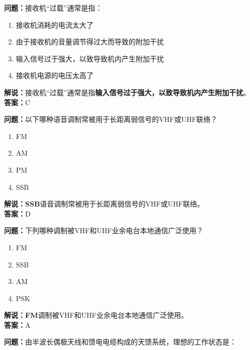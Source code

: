\documentclass{ctexbook}
\begin{document}
\bigskip


\noindent\textbf{问题：}接收机“过载”通常是指：

\begin{enumerate}[label=\Alph*), leftmargin=3em]
	\item 接收机消耗的电流太大了
	\item 由于接收机的音量调节得过大而导致的附加干扰
	\item 输入信号过于强大，以致导致机内产生附加干扰
	\item 接收机电源的电压太高了
\end{enumerate}

\noindent\textbf{解说：}接收机“过载”通常是指\textbf{输入信号过于强大，以致导致机内产生附加干扰}。\\\noindent\textbf{答案：}C%


\bigskip


\noindent\textbf{问题：}以下哪种语音调制常被用于长距离弱信号的VHF或UHF联络？

\begin{enumerate}[label=\Alph*), leftmargin=3em]
	\item FM
	\item AM
	\item PM
	\item SSB
\end{enumerate}

\noindent\textbf{解说：}\textbf{SSB}语音调制常被用于长距离弱信号的VHF或UHF联络。\\\noindent\textbf{答案：}D%


\bigskip


\noindent\textbf{问题：}下列哪种调制被VHF和UHF业余电台本地通信广泛使用？

\begin{enumerate}[label=\Alph*), leftmargin=3em]
	\item FM
	\item SSB
	\item AM
	\item PSK
\end{enumerate}


\noindent\textbf{解说：}\textbf{FM}调制被VHF和UHF业余电台本地通信广泛使用。\\\noindent\textbf{答案：}A%


\bigskip





\noindent\textbf{问题：}由半波长偶极天线和馈电电缆构成的天馈系统，理想的工作状态是：
\end{document}
